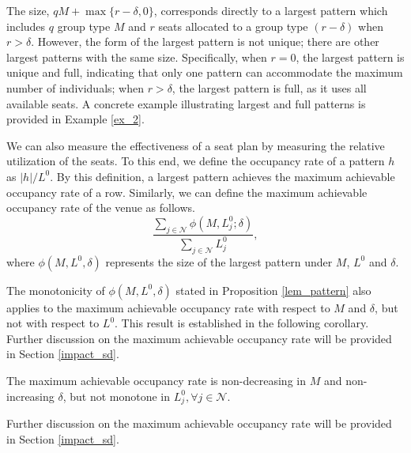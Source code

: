 The size, $qM + \max\{r-\delta, 0\}$, corresponds directly to a largest pattern which includes $q$ group type $M$ and $r$ seats allocated to a group type $(r-\delta)$ when $r>\delta$. However, the form of the largest pattern is not unique; there are other largest patterns with the same size. 
Specifically, when $r = 0$, the largest pattern is unique and full, indicating that only one pattern can accommodate the maximum number of individuals; when $r > \delta$, the largest pattern is full, as it uses all available seats. A concrete example illustrating largest and full patterns is provided in Example \ref{ex_2}. 

We can also measure the effectiveness of a seat plan by measuring the relative utilization of the seats. To this end, we define the occupancy rate of a pattern $h$ as $|h|/L^0$. By this definition, a largest pattern achieves the maximum achievable occupancy rate of a row. Similarly, we can define the maximum achievable occupancy rate of the venue as follows. 
$$\frac{\sum_{j \in \mathcal{N}}\phi(M, L_{j}^{0}; \delta)}{\sum_{j \in \mathcal{N}} L_{j}^{0}},$$
where $\phi(M, L^{0}, \delta)$ represents the size of the largest pattern under $M$, $L^{0}$ and $\delta$.

The monotonicity of $\phi(M, L^{0}, \delta)$ stated in Proposition \ref{lem_pattern} also applies to the maximum achievable occupancy rate with respect to $M$ and $\delta$, but not with respect to $L^{0}$. This result is established in the following corollary. 
Further discussion on the maximum achievable occupancy rate will be provided in Section \ref{impact_sd}.


\begin{corollary}\label{maximum_phi}
The maximum achievable occupancy rate is non-decreasing in $M$ and non-increasing $\delta$, but not monotone in $L_{j}^{0}, \forall j \in \mathcal{N}$.
\end{corollary}

 Further discussion on the maximum achievable occupancy rate will be provided in Section \ref{impact_sd}.


